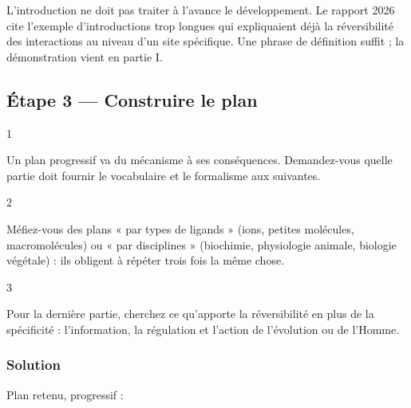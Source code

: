 \documentclass[11pt,a4paper]{article}
\begin{document}
\begin{piege}

L'introduction ne doit pas traiter à l'avance le développement. Le rapport 2026 cite l'exemple d'introductions trop longues qui expliquaient déjà la réversibilité des interactions au niveau d'un site spécifique. Une phrase de définition suffit ; la démonstration vient en partie I.

\end{piege}

\hypertarget{uxe9tape-3-construire-le-plan}{%
\subsection{Étape 3 --- Construire le plan}\label{uxe9tape-3-construire-le-plan}}

\begin{indication}{1}

Un plan progressif va du mécanisme à ses conséquences. Demandez-vous quelle partie doit fournir le vocabulaire et le formalisme aux suivantes.

\end{indication}

\begin{indication}{2}

Méfiez-vous des plans « par types de ligands » (ions, petites molécules, macromolécules) ou « par disciplines » (biochimie, physiologie animale, biologie végétale) : ils obligent à répéter trois fois la même chose.

\end{indication}

\begin{indication}{3}

Pour la dernière partie, cherchez ce qu'apporte la réversibilité en plus de la spécificité : l'information, la régulation et l'action de l'évolution ou de l'Homme.

\end{indication}

\hypertarget{solution-2}{%
\subsubsection{Solution}\label{solution-2}}

Plan retenu, progressif :
\end{document}
